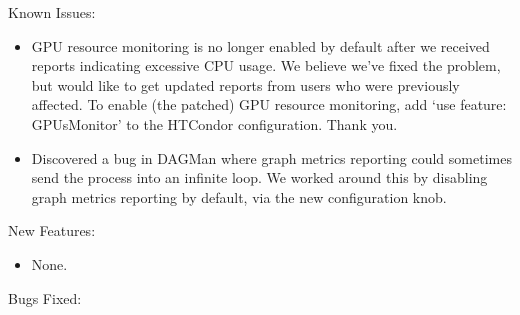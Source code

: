 \noindent Known Issues:

\begin{itemize}

\item GPU resource monitoring is no longer enabled by default after we
received reports indicating excessive CPU usage.  We believe we've fixed
the problem, but would like to get updated reports from users who were
previously affected.  To enable (the patched) GPU resource monitoring,
add `use feature: GPUsMonitor' to the HTCondor configuration.  Thank you.


\item Discovered a bug in DAGMan where graph metrics reporting could sometimes 
send the  process into an infinite loop. We worked around this 
by disabling graph metrics reporting by default, via the new  
 configuration knob.

\end{itemize}


\noindent New Features:

\begin{itemize}

\item None.

\end{itemize}

\noindent Bugs Fixed:

